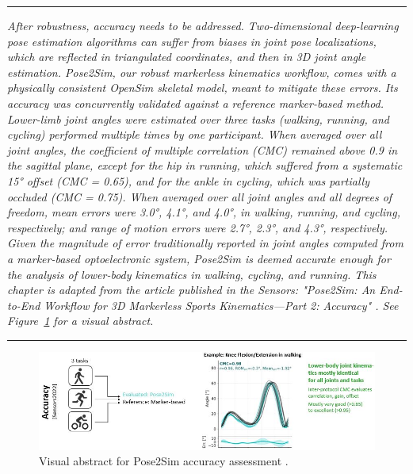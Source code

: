 \begin{center}
\rule{0.7\linewidth}{.5pt}
\begin{minipage}{0.7\linewidth}
\smallskip

\textit{After robustness, accuracy needs to be addressed. Two-dimensional deep-learning pose estimation algorithms can suffer from biases in joint pose localizations, which are reflected in triangulated coordinates, and then in 3D joint angle estimation. Pose2Sim, our robust markerless kinematics workflow, comes with a physically consistent OpenSim skeletal model, meant to mitigate these errors. \newline\newline
Its accuracy was concurrently validated against a reference marker-based method. Lower-limb joint angles were estimated over three tasks (walking, running, and cycling) performed multiple times by one participant. When averaged over all joint angles, the coefficient of multiple correlation (CMC) remained above 0.9 in the sagittal plane, except for the hip in running, which suffered from a systematic 15° offset (CMC = 0.65), and for the ankle in cycling, which was partially occluded (CMC = 0.75). When averaged over all joint angles and all degrees of freedom, mean errors were 3.0°, 4.1°, and 4.0°, in walking, running, and cycling, respectively; and range of motion errors were 2.7°, 2.3°, and 4.3°, respectively. Given the magnitude of error traditionally reported in joint angles computed from a marker-based optoelectronic system, Pose2Sim is deemed accurate enough for the analysis of lower-body kinematics in walking, cycling, and running.\newline\newline
This chapter is adapted from the article published in the Sensors: "Pose2Sim: An End-to-End Workflow for 3D Markerless Sports Kinematics—Part 2: Accuracy" \cite{Pagnon2022a}. See Figure~\ref{fig_visabstract3} for a visual abstract.
}

\end{minipage}
\smallskip
\rule{0.7\linewidth}{.5pt}
\end{center}

\pagebreak
\minitoc

\vspace*{3cm}

\begin{figure}[hbtp]
	\centering
	\def\svgwidth{1\columnwidth}
	\fontsize{10pt}{10pt}\selectfont
	\includegraphics[width=\linewidth]{"../Intro/Figures/Fig_VisAbstract3.JPG"}
      \caption{Visual abstract for Pose2Sim accuracy assessment \cite{Pagnon2022a}.}
	\label{fig_visabstract3}
\end{figure}

